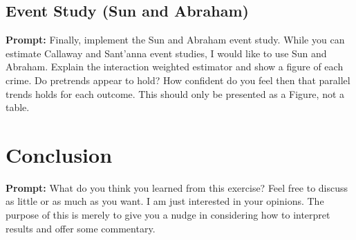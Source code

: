 \documentclass{article}
\begin{document}
\subsection{Event Study (Sun and Abraham)}

\textbf{Prompt: } Finally, implement the Sun and Abraham event study.  While you can estimate Callaway and Sant’anna event studies, I would like to use Sun and Abraham.  Explain the interaction weighted estimator and show a figure of each crime.  Do pretrends appear to hold?  How confident do you feel then that parallel trends holds for each outcome.  This should only be presented as a Figure, not a table.  

\section{Conclusion}

\textbf{Prompt: }What do you think you learned from this exercise?  Feel free to discuss as little or as much as you want.  I am just interested in your opinions.  The purpose of this is merely to give you a nudge in considering how to interpret results and offer some commentary. 
\end{document}
